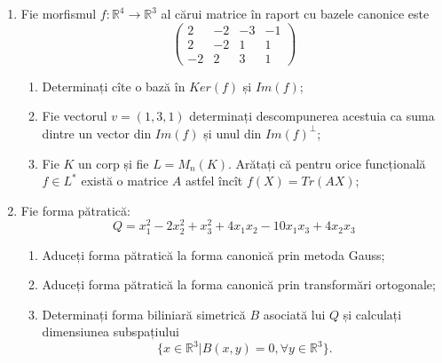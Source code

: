 \documentclass{article}
\begin{document}
\begin{enumerate}
 \item Fie morfismul $f:\mathbb{R}^4 \to \mathbb{R}^3$ al cărui matrice în raport cu bazele canonice este
$$\begin{pmatrix}
2&-2&-3&-1\\
2&-2&1&1\\
-2&2&3&1
\end{pmatrix}$$

\begin{enumerate}
\item Determinați cîte o bază în $Ker(f)$ și $Im(f)$;
\item Fie vectorul $v=(1,3,1)$ determinați descompunerea acestuia ca suma dintre un vector din $Im(f)$ și unul din $Im(f)^\perp$;
\item Fie $K$ un corp și fie $L=M_n(K)$. Arătați că pentru orice funcțională $f \in L^*$ există o matrice $A$ astfel încît $f(X)=Tr(AX)$;
\end{enumerate}
\item Fie forma pătratică:
$$Q= x_1^2-2x_2^2+x_3^2+4x_1x_2-10x_1x_3+4x_2x_3$$

\begin{enumerate}
\item Aduceți forma pătratică la forma canonică prin metoda Gauss;
\item Aduceți forma pătratică la forma canonică prin transformări ortogonale;
\item Determinați forma biliniară simetrică $B$ asociată lui $Q$ și calculați dimensiunea subspațiului
$$\{x \in \mathbb{R}^3 | B(x,y)=0,\forall y \in \mathbb{R}^3\}.$$

\end{enumerate}
\end{enumerate}
\newpage
\end{document}
